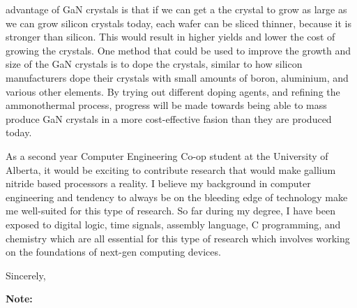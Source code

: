 \documentclass[letterpaper]{letter}
\begin{document}
\begin{letter}
advantage of GaN crystals is that if we can get a the crystal to grow as large
as we can grow silicon crystals today, each wafer can be sliced thinner, because
it is stronger than silicon. This would result in higher yields and lower the
cost of growing the crystals. One method that could be used to improve the
growth and size of the GaN crystals is to dope the crystals, similar to how
silicon manufacturers dope their crystals with small amounts of boron,
aluminium, and various other elements. By trying out different doping agents,
and refining the ammonothermal process, progress will be made towards being able
to mass produce GaN crystals in a more cost-effective fasion than they are
produced today.



As a second year Computer Engineering Co-op student at the University of
Alberta, it would be exciting to contribute research that would make gallium
nitride based processors a reality. I believe my background in computer
engineering and tendency to always be on the bleeding edge of technology make me
well-suited for this type of research. So far during my degree, I have been
exposed to digital logic, time signals, assembly language, C programming, and
chemistry which are all essential for this type of research which involves
working on the foundations of next-gen computing devices.

\closing{Sincerely,}

\end{letter}
\newpage
\textbf{Note:}
\end{document}
